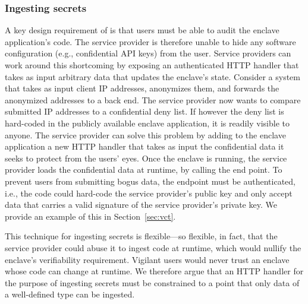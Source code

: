 \subsubsection{Ingesting secrets}%
\label{sec:secrets}

A key design requirement of \tool{} is that users must be able to audit the
enclave application's code.  The service provider is therefore unable to hide
any software configuration (e.g., confidential API keys) from the user.  Service
providers can work around this shortcoming by exposing an authenticated HTTP
handler that takes as input arbitrary data that updates the enclave's state.
Consider a system that takes as input client IP addresses, anonymizes them, and
forwards the anonymized addresses to a back end.  The service provider now wants
to compare submitted IP addresses to a confidential deny list.  If however the
deny list is hard-coded in the publicly available enclave application, it is
readily visible to anyone.  The service provider can solve this problem by
adding to the enclave application a new HTTP handler that takes as input the
confidential data it seeks to protect from the users' eyes.  Once the enclave is
running, the service provider loads the confidential data at runtime, by calling
the end point.  To prevent users from submitting bogus data, the endpoint must
be authenticated, i.e., the code could hard-code the service provider's public
key and only accept data that carries a valid signature of the service
provider's private key.  We provide an example of this in Section~\ref{sec:vct}.

This technique for ingesting secrets is flexible---so flexible, in fact, that
the service provider could abuse it to ingest code at runtime, which would
nullify the enclave's verifiability requirement.  Vigilant users would never
trust an enclave whose code can change at runtime.  We therefore argue that an
HTTP handler for the purpose of ingesting secrets must be constrained to a point
that only data of a well-defined type can be ingested.
